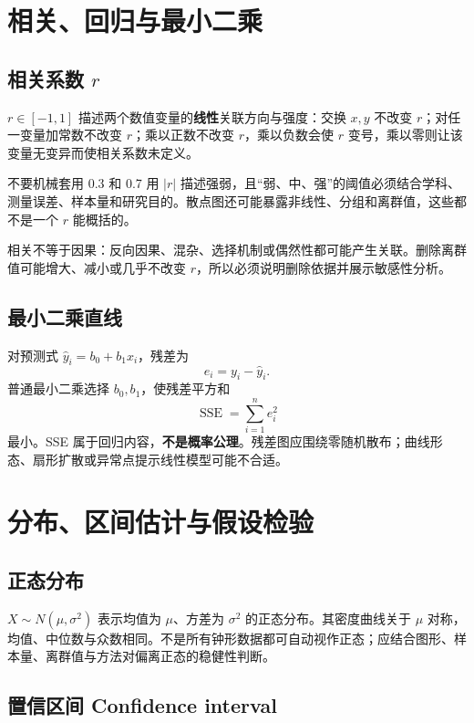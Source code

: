 \documentclass[11pt,a4paper,fontset=fandol]{ctexart}
\begin{document}
\section{相关、回归与最小二乘}

\subsection{相关系数 \texorpdfstring{$r$}{r}}

$r\in[-1,1]$ 描述两个数值变量的\textbf{线性}关联方向与强度：交换 $x,y$ 不改变 $r$；对任一变量加常数不改变 $r$；乘以正数不改变 $r$，乘以负数会使 $r$ 变号，乘以零则让该变量无变异而使相关系数未定义。

\begin{trapbox}{不要机械套用 0.3 和 0.7}
用 $|r|$ 描述强弱，且“弱、中、强”的阈值必须结合学科、测量误差、样本量和研究目的。散点图还可能暴露非线性、分组和离群值，这些都不是一个 $r$ 能概括的。
\end{trapbox}

相关不等于因果：反向因果、混杂、选择机制或偶然性都可能产生关联。删除离群值可能增大、减小或几乎不改变 $r$，所以必须说明删除依据并展示敏感性分析。

\subsection{最小二乘直线}

对预测式 $\hat y_i=b_0+b_1x_i$，残差为
\[
e_i=y_i-\hat y_i.
\]
普通最小二乘选择 $b_0,b_1$，使残差平方和
\[
\operatorname{SSE}=\sum_{i=1}^{n} e_i^2
\]
最小。SSE 属于回归内容，\textbf{不是概率公理}。残差图应围绕零随机散布；曲线形态、扇形扩散或异常点提示线性模型可能不合适。

\section{分布、区间估计与假设检验}

\subsection{正态分布}

$X\sim N(\mu,\sigma^2)$ 表示均值为 $\mu$、方差为 $\sigma^2$ 的正态分布。其密度曲线关于 $\mu$ 对称，均值、中位数与众数相同。不是所有钟形数据都可自动视作正态；应结合图形、样本量、离群值与方法对偏离正态的稳健性判断。

\subsection{置信区间 Confidence interval}
\end{document}
